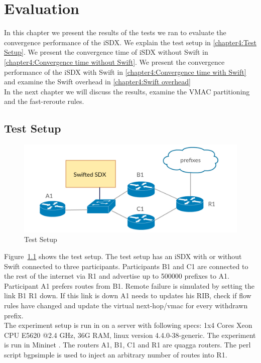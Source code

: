 \chapter{\label{chapter4}Evaluation}

In this chapter we present the results of the tests we ran to evaluate the convergence performance of the iSDX. We explain the test setup in \ref{chapter4:Test Setup}. We present the convergence time of iSDX without Swift in \ref{chapter4:Convergence time without Swift}. We present the convergence performance of the iSDX with Swift in \ref{chapter4:Convergence time with Swift} and examine the Swift overhead in \ref{chapter4:Swift overhead} \\
In the next chapter we will discuss the results, examine the VMAC partitioning and the fast-reroute rules.

\section{\label{chapter4:Test Setup}Test Setup}

\begin{figure}[h]
\center
\includegraphics[scale = 0.36]{Figures/eval_exp_setup.pdf}
\caption{Test Setup}
\label{fig:test-setup}
\end{figure}

Figure~\ref{fig:test-setup} shows the test setup.
The test setup has an iSDX with or without Swift connected to three participants. Participants B1 and C1 are connected to the rest of the internet via R1 and advertise up to 500000 prefixes to A1. Participant A1 prefers routes from B1. Remote failure is simulated by setting the link B1 R1 down. If this link is down A1 needs to updates his RIB, check if flow rules have changed and update the virtual next-hop/vmac for every withdrawn prefix.\\ 
The experiment setup is run in on a server with following specs: 1x4 Cores Xeon CPU E5620 @2.4 GHz, 36G RAM, linux version 4.4.0-38-generic. The experiment is run in Mininet \cite{mininet}. The routers A1, B1, C1 and R1 are quagga \cite{quagga} routers. The perl script bgpsimple \cite{bgpsimple}is used to inject an arbitrary number of routes into R1. 



